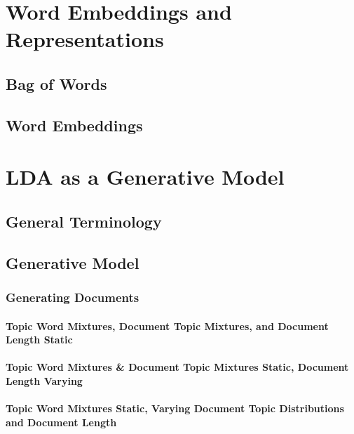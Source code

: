 \documentclass[]{book}
\theoremstyle{definition}
\theoremstyle{definition}
\theoremstyle{definition}
\theoremstyle{remark}
\begin{document}
\chapter{Word Embeddings and
Representations}\label{word-embeddings-and-representations}

\section{Bag of Words}\label{bag-of-words}

\section{Word Embeddings}\label{word-embeddings}

\chapter{LDA as a Generative Model}\label{lda-as-a-generative-model}

\section{General Terminology}\label{general-terminology}

\section{Generative Model}\label{generative-model}

\subsection{Generating Documents}\label{generating-documents}

\subsubsection{Topic Word Mixtures, Document Topic Mixtures, and
Document Length
Static}\label{topic-word-mixtures-document-topic-mixtures-and-document-length-static}

\subsubsection{Topic Word Mixtures \& Document Topic Mixtures Static,
Document Length
Varying}\label{topic-word-mixtures-document-topic-mixtures-static-document-length-varying}

\subsubsection{Topic Word Mixtures Static, Varying Document Topic
Distributions and Document
Length}\label{topic-word-mixtures-static-varying-document-topic-distributions-and-document-length}
\end{document}

